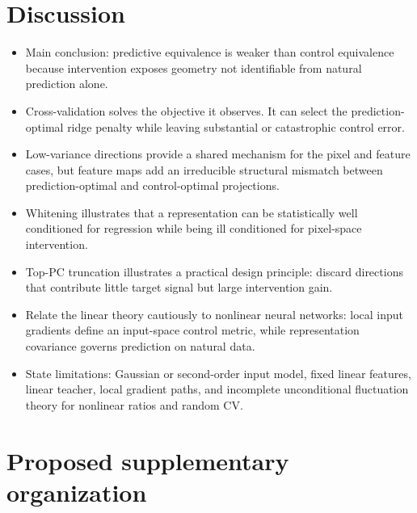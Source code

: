 \documentclass[11pt]{article}
\begin{document}
\section{Discussion}
\label{sec:discussion}

\begin{itemize}
  \item Main conclusion: predictive equivalence is weaker than control
        equivalence because intervention exposes geometry not identifiable
        from natural prediction alone.
  \item Cross-validation solves the objective it observes. It can select the
        prediction-optimal ridge penalty while leaving substantial or
        catastrophic control error.
  \item Low-variance directions provide a shared mechanism for the pixel and
        feature cases, but feature maps add an irreducible structural mismatch
        between prediction-optimal and control-optimal projections.
  \item Whitening illustrates that a representation can be statistically
        well conditioned for regression while being ill conditioned for
        pixel-space intervention.
  \item Top-PC truncation illustrates a practical design principle: discard
        directions that contribute little target signal but large intervention
        gain.
  \item Relate the linear theory cautiously to nonlinear neural networks:
        local input gradients define an input-space control metric, while
        representation covariance governs prediction on natural data.
  \item State limitations: Gaussian or second-order input model, fixed linear
        features, linear teacher, local gradient paths, and incomplete
        unconditional fluctuation theory for nonlinear ratios and random CV.
\end{itemize}

\section*{Proposed supplementary organization}
\end{document}
